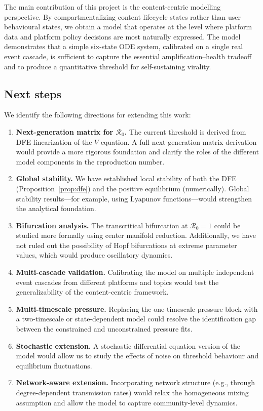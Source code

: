 \documentclass[11pt]{article}
\begin{document}
The main contribution of this project is the content-centric modelling perspective. By compartmentalizing content lifecycle states rather than user behavioural states, we obtain a model that operates at the level where platform data and platform policy decisions are most naturally expressed. The model demonstrates that a simple six-state ODE system, calibrated on a single real event cascade, is sufficient to capture the essential amplification--health tradeoff and to produce a quantitative threshold for self-sustaining virality.

\subsection{Next steps}
\label{sec:nextsteps}

We identify the following directions for extending this work:

\begin{enumerate}[leftmargin=1.5em]
    \item \textbf{Next-generation matrix for $\mathcal{R}_0$.} The current threshold is derived from DFE linearization of the $\dot{V}$ equation. A full next-generation matrix derivation would provide a more rigorous foundation and clarify the roles of the different model components in the reproduction number.

    \item \textbf{Global stability.} We have established local stability of both the DFE (Proposition~\ref{prop:dfe}) and the positive equilibrium (numerically). Global stability results---for example, using Lyapunov functions---would strengthen the analytical foundation.

    \item \textbf{Bifurcation analysis.} The transcritical bifurcation at $\mathcal{R}_0 = 1$ could be studied more formally using center manifold reduction. Additionally, we have not ruled out the possibility of Hopf bifurcations at extreme parameter values, which would produce oscillatory dynamics.

    \item \textbf{Multi-cascade validation.} Calibrating the model on multiple independent event cascades from different platforms and topics would test the generalizability of the content-centric framework.

    \item \textbf{Multi-timescale pressure.} Replacing the one-timescale pressure block with a two-timescale or state-dependent model could resolve the identification gap between the constrained and unconstrained pressure fits.

    \item \textbf{Stochastic extension.} A stochastic differential equation version of the model would allow us to study the effects of noise on threshold behaviour and equilibrium fluctuations.

    \item \textbf{Network-aware extension.} Incorporating network structure (e.g., through degree-dependent transmission rates) would relax the homogeneous mixing assumption and allow the model to capture community-level dynamics.
\end{enumerate}
\end{document}
